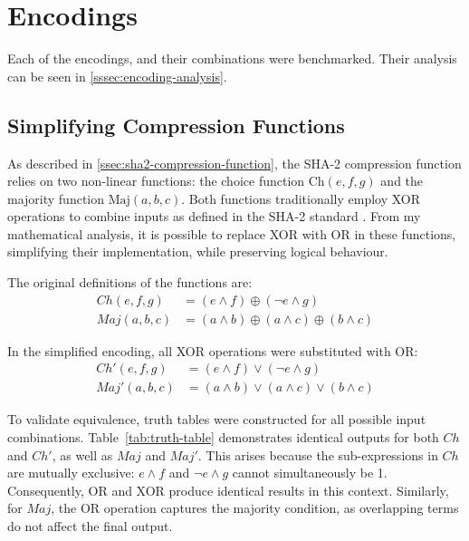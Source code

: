 \documentclass[a4paper]{report}
\begin{document}
\section{Encodings}
\label{sec:encoding}
Each of the encodings, and their combinations were benchmarked.
Their analysis can be seen in \ref{sssec:encoding-analysis}.

\subsection{Simplifying Compression Functions}
\label{ssec:simplification-encoding}
As described in \ref{ssec:sha2-compression-function}, the SHA-2 compression function relies on two non-linear functions:
the choice function \(\textrm{Ch}(e, f, g)\) and the majority function \(\textrm{Maj}(a, b, c)\).
Both functions traditionally employ XOR operations to combine inputs as defined in the SHA-2 standard \cite{NIST_SP_180_4}.
From my mathematical analysis, it is possible to replace XOR with OR in these functions, simplifying their implementation, while preserving logical behaviour.

The original definitions of the functions are:
\begin{equation}
	\begin{aligned}
		Ch(e, f, g) &= (e \land f) \oplus (\neg e \land g) \\
		Maj(a, b, c) &= (a \land b) \oplus (a \land c) \oplus (b \land c)
	\end{aligned}
\end{equation}

In the simplified encoding, all XOR operations were substituted with OR:
\begin{equation}
	\begin{aligned}
		Ch'(e, f, g) &= (e \land f) \lor (\neg e \land g) \\
		Maj'(a, b, c) &= (a \land b) \lor (a \land c) \lor (b \land c)
	\end{aligned}
\end{equation}

To validate equivalence, truth tables were constructed for all possible input combinations.
Table~\ref{tab:truth-table} demonstrates identical outputs for both $Ch$ and $Ch'$, as well as $Maj$ and $Maj'$.
This arises because the sub-expressions in $Ch$ are mutually exclusive: $e \land f$ and $\neg e \land g$ cannot simultaneously be 1.
Consequently, OR and XOR produce identical results in this context.
Similarly, for $Maj$, the OR operation captures the majority condition, as overlapping terms do not affect the final output.
\end{document}
